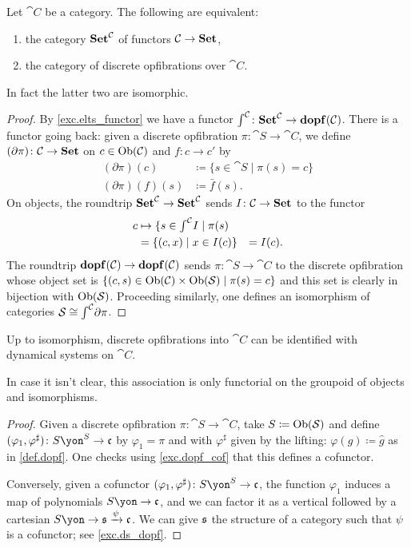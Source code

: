 \documentclass[Book-Poly]{subfiles}
\begin{document}
\begin{proposition}\label{prop.tfae_dopf}
Let $\cat{C}$ be a category. The following are equivalent:
\begin{enumerate}
	\item the category $\mathbf{Set}^{\mathcal{C}}$ of functors $\mathcal{C}\to\mathbf{Set}$,
	\item the category of discrete opfibrations over $\cat{C}$.
\end{enumerate}
In fact the latter two are isomorphic.
\end{proposition}
\begin{proof}
By \cref{exc.elts_functor} we have a functor $\textstyle{\int}^{\mathcal{C}}\colon\mathbf{Set}^{\mathcal{C}}\to\mathbf{dopf}(\mathcal{C})$. There is a functor going back: given a discrete opfibration $\pi\colon\cat{S}\to\cat{C}$, we define $(\partial\pi)\colon\mathcal{C}\to\mathbf{Set}$ on $c\in\operatorname{Ob}(\mathcal{C})$ and $f\colon c\to c'$ by 
\begin{align*}
	(\partial\pi)(c)&\coloneqq\{s\in\cat{S}\mid\pi(s)=c\}\\
	(\partial\pi)(f)(s)&\coloneqq\bar{f}(s).
\end{align*}
On objects, the roundtrip $\mathbf{Set}^{\mathcal{C}}\to\mathbf{Set}^{\mathcal{C}}$ sends $I\colon\mathcal{C}\to\mathbf{Set}$ to the functor
\begin{align*}
	c&
	\mapsto\{s\in\textstyle{\int}^{\mathcal{C}}I\mid \pi(s)\\&
	=\{(c,x)\mid x\in I(c)\}&=I(c).
\end{align*}
The roundtrip $\mathbf{dopf}(\mathcal{C})\to\mathbf{dopf}(\mathcal{C})$ sends $\pi\colon\cat{S}\to\cat{C}$ to the discrete opfibration whose object set is $\{(c,s)\in\operatorname{Ob}(\mathcal{C})\times\operatorname{Ob}(\mathcal{S})\mid\pi(s)=c\}$ and this set is clearly in bijection with $\operatorname{Ob}(\mathcal{S})$. Proceeding similarly, one defines an isomorphism of categories $\mathcal{S}\cong\textstyle{\int}^{\mathcal{C}}\partial\pi$.
\end{proof}


\begin{proposition}\label{prop.ds_dopf}
Up to isomorphism, discrete opfibrations into $\cat{C}$ can be identified with dynamical systems on $\cat{C}$.
\end{proposition}
In case it isn't clear, this association is only functorial on the groupoid of objects and isomorphisms.
\begin{proof}
Given a discrete opfibration $\pi\colon\cat{S}\to\cat{C}$, take $S\coloneqq\operatorname{Ob}(\mathcal{S})$ and define $(\varphi_1,\varphi^\sharp)\colon S\yon^S\to\car{c}$ by $\varphi_1=\pi$ and with $\varphi^\sharp$ given by the lifting: $\varphi(g)\coloneqq \hat{g}$ as in \cref{def.dopf}. One checks using \cref{exc.dopf_cof} that this defines a cofunctor. 

Conversely, given a cofunctor $(\varphi_1,\varphi^\sharp)\colon S\yon^S\to\car{c}$, the function $\varphi_1$ induces a map of polynomials $S\yon\to\car{c}$, and we can factor it as a vertical followed by a cartesian $S\yon\to\car{s}\To{\psi}\car{c}$. We can give $\mathfrak{s}$ the structure of a category such that $\psi$ is a cofunctor; see \cref{exc.ds_dopf}.
\end{proof}
\end{document}
